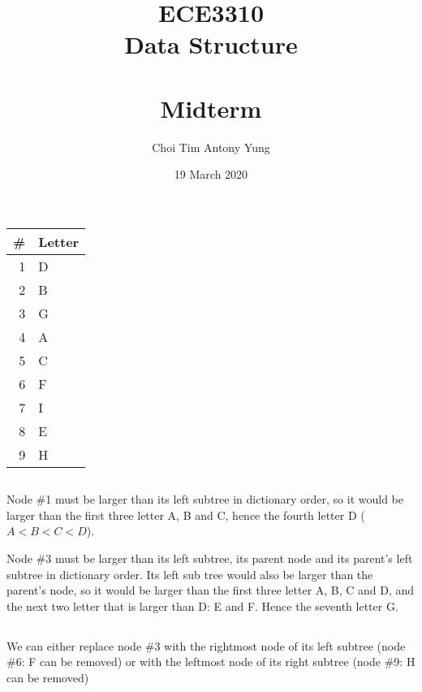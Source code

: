 \documentclass{article}
\title{ECE3310\\Data Structure\\\,\\Midterm\\}
\author{Choi Tim Antony Yung}
\date{19 March 2020}
\begin{document}
\clearpage\maketitle
\thispagestyle{empty}

\newpage
\setcounter{page}{1}
\section{}
\subsection{}
\begin{table}[H]
    \centering
    \begin{tabular}{rl}
            \toprule
            \#&Letter\\
            \midrule
            1&D\\
            2&B\\
            3&G\\
            4&A\\
            5&C\\
            6&F\\
            7&I\\
            8&E\\
            9&H\\
            \bottomrule
    \end{tabular} 
\end{table}
\subsection{}
Node \#1 must be larger than its left subtree in dictionary order, so it would be larger than the first three letter A, B and C, hence the fourth letter D ($A<B<C<D$). 

Node \#3 must be larger than its left subtree, its parent node and its parent's left subtree in dictionary order. Its left sub tree would also be larger than the parent's node, so it would be larger than the first three letter A, B, C and D, and the next two letter that is larger than D: E and F. Hence the seventh letter G. 

\subsection{}
We can either replace node \#3 with the rightmost node of its left subtree (node \#6: F can be removed) or with the leftmost node of its right subtree (node \#9: H can be removed)
\end{document}
